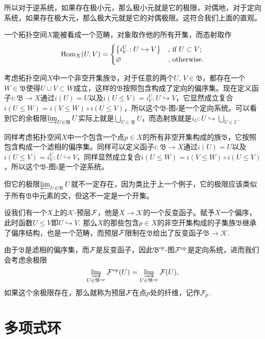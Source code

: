 所以对于逆系统，如果存在极小元，那么极小元就是它的极限，对偶地，对于定向系统，如果存在极大元，那么极大元就是它的对偶极限。这符合我们上面的直观。

\para 一个拓扑空间$X$能被看成一个范畴，对象取作他的所有开集，而态射取作
\[
	\operatorname{Hom}_{X}(U,V)=\begin{cases}
	\bigl\{i^U_V:U\hookrightarrow V\bigr\}&\text{, if }U\subset V\text{;}\\
	\varnothing&\text{, otherwise}.
	\end{cases}
\]

考虑拓扑空间$X$中一个非空开集族$\mathfrak{B}$，对于任意的两个$U$, $V\in \mathfrak{B}$，都存在一个$W\in \mathfrak{B}$使得$U\cup V\subset W$成立，这样的$\mathfrak{B}$按照包含构成了定向的偏序集。现在定义函子$i:\mathfrak{B}\to X$通过$i(U)=U$以及$i(U\leq V)=i^U_V:U\hookrightarrow V$，它显然成立复合$i(U\leq W)=i(V\leq W)\circ i(U\leq V)$，所以这个$\mathfrak{B}$-图$i$是一个定向系统。可以看到它的余极限$\varinjlim_{U\in \mathfrak{B}} U$实际上就是$\bigcup_{U\in \mathfrak{B}} U$，而态射族就是$i_U:U\hookrightarrow \bigcup_{U\in I}$.

同样考虑拓扑空间$X$中一个包含一个点$p\in X$的所有非空开集构成的族$\mathfrak{B}$，它按照包含构成一个滤相的偏序集。同样可以定义函子$i:\mathfrak{B}\to X$通过$i(U)=U$以及$i(U\leq V)=i^U_V:U\hookrightarrow V$，同样显然成立复合$i(U\leq W)=i(V\leq W)\circ i(U\leq V)$，所以这个$\mathfrak{B}$-图$i$是一个逆系统。

但它的极限$\varprojlim_{U\in \mathfrak{B}} U$就不一定存在，因为类比于上一个例子，它的极限应该类似于所有$\mathfrak{B}$中元素的交，但这不一定是一个开集。

\para 设我们有一个$X$上的$\mathcal{K}$-预层$\mathcal{F}$，他是$X\to \mathcal{K}$的一个反变函子。赋予$X$一个偏序，此时函数$U\leq V$即$U\hookrightarrow V$. 那么$X$的那些包含$p\in X$的非空开集构成的子集族$\mathfrak{B}$继承了偏序结构，也是一个范畴，而预层$\mathcal{F}$限制在$\mathfrak{B}$给出了反变函子$\mathfrak{B}\to \mathcal{K}$.

由于$\mathfrak{B}$是滤相的偏序集，而$\mathcal{F}$是反变函子，因此$\mathfrak{B}^{\mathrm{op}}$-图$\mathcal{F}^{\mathrm{op}}$是定向系统，进而我们会考虑余极限
\[
	\varinjlim_{U\in \mathfrak{B}^{\mathrm{op}}} \mathcal{F}^{\mathrm{op}}(U)=\varinjlim_{U\in \mathfrak{B}^{\mathrm{op}}} \mathcal{F}(U),
\]
如果这个余极限存在，那么就称为预层$\mathcal{F}$在点$p$处的纤维，记作$\mathcal{F}_p$.

\section{多项式环}

